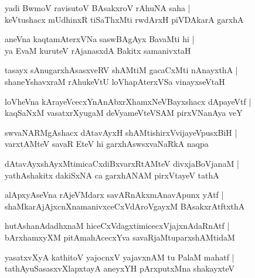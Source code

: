 \begin{shloka}
yadi BwmoV ravisutoV BAsakxroV rAhuNA saha |\\
keVtushacx mUdhinxR tiSaThxMti rwdArxH piVDAkarA garxhA 
\end{shloka}

\begin{shloka}
aneVna kaqtamAterxVNa saswBAgAyx BavaMti hi |\\
ya EvaM kuruteV rAjanasxdA Bakitx samanivxtaH 
\end{shloka}

\begin{shloka}
tasayx sAnugarxhAsasxveRV shAMtiM gacaCxMti nAnayxthA |\\
shaneYshavxraM rAhukeVtU loVhapAterxVSa vinayxseVtaH
\end{shloka}

\begin{shloka}
loVheVna kArayeVcecxYnAnAbxrXhamxNeVBayxshacx dApayeVtf |\\
kaqSaNxM vasatxrXyugaM deVyameVteVSAM pirxVNanAya veY
\end{shloka}

\begin{shloka}
swvaNARMgAshacx dAtavAyxH shAMtishirxVvijayeVpusxBiH |\\
varxtAMteV savaR EteV hi garxhAswsxvaNaRkA naqpa
\end{shloka}

\begin{shloka}
dAtavAyxshAyxMtimicaCxdiBxvarxRtAMteV divxjaBoVjanaM |\\
yathAshakitx dakiSxNA ca garxhANAM pirxVtayeV tathA
\end{shloka}

\begin{shloka}
alApxyAseVna rAjeVMdarx savARnAkxmAnavApunx yAtf |\\
shaMkarAjAjxcnXnamanivxceCxVdAroVgayxM BAsakxrAtftxthA
\end{shloka}

\begin{shloka}
hutAshanAdadhxnaM hiceCxVdagxtimicecxVjajxnAdaRnAtf |\\
bArxhamxyXM pitAmahAcecxYva savaRjaMtuparxshAMtidaM 
\end{shloka}

\begin{shloka}
yasatxvXyA kathitoV yajocnxV yajavxnAM tu PalaM mahatf |\\
tathAyuSasasxvXlapxtayA aneyxYH pArxputxMna shakayxteV
\end{shloka}

